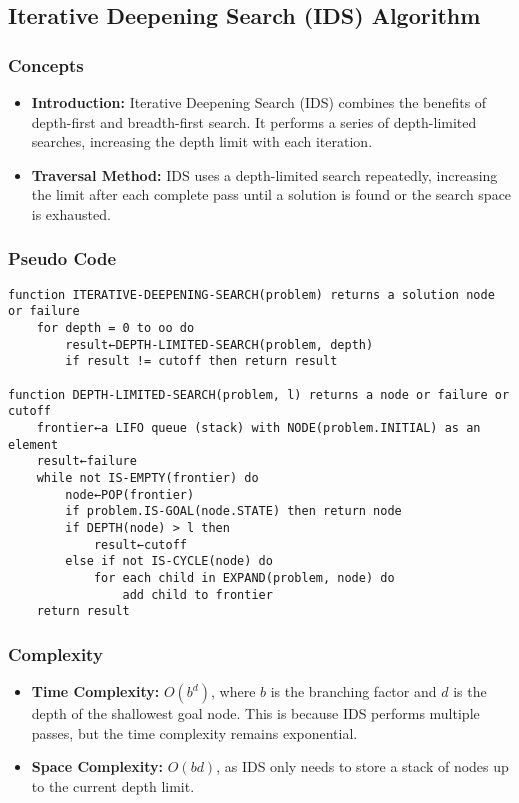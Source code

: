 \subsection{Iterative Deepening Search (IDS) Algorithm}
\subsubsection*{Concepts}
\begin{itemize}
    \item \textbf{Introduction:} Iterative Deepening Search (IDS) combines the benefits of depth-first and breadth-first search. It performs a series of depth-limited searches, increasing the depth limit with each iteration.
    \item \textbf{Traversal Method:} IDS uses a depth-limited search repeatedly, increasing the limit after each complete pass until a solution is found or the search space is exhausted.
\end{itemize}

\subsubsection*{Pseudo Code}
\begin{verbatim}
function ITERATIVE-DEEPENING-SEARCH(problem) returns a solution node or failure
    for depth = 0 to oo do
        result←DEPTH-LIMITED-SEARCH(problem, depth)
        if result != cutoff then return result

function DEPTH-LIMITED-SEARCH(problem, l) returns a node or failure or cutoff
    frontier←a LIFO queue (stack) with NODE(problem.INITIAL) as an element
    result←failure
    while not IS-EMPTY(frontier) do
        node←POP(frontier)
        if problem.IS-GOAL(node.STATE) then return node
        if DEPTH(node) > l then
            result←cutoff
        else if not IS-CYCLE(node) do
            for each child in EXPAND(problem, node) do
                add child to frontier
    return result
\end{verbatim}

\subsubsection*{Complexity}
\begin{itemize}
    \item \textbf{Time Complexity:} \(O(b^d)\), where \(b\) is the branching factor and \(d\) is the depth of the shallowest goal node. This is because IDS performs multiple passes, but the time complexity remains exponential.
    \item \textbf{Space Complexity:} \(O(bd)\), as IDS only needs to store a stack of nodes up to the current depth limit.
\end{itemize}

